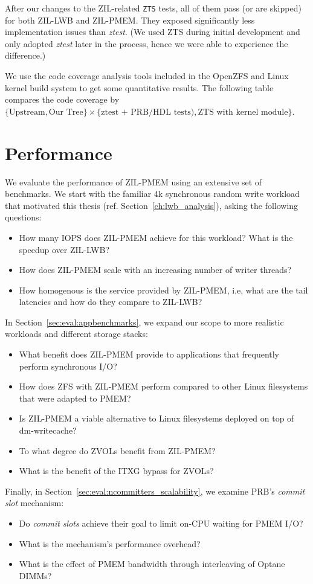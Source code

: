 \documentclass[12pt,a4paper,twoside]{book}
\begin{document}
After our changes to the ZIL-related \lstinline{ZTS} tests, all of them pass (or are skipped) for both ZIL-LWB and ZIL-PMEM.
They exposed significantly less implementation issues than \textit{ztest}.
(We used ZTS during initial development and only adopted \textit{ztest} later in the process, hence we were able to experience the difference.)

We use the code coverage analysis tools included in the OpenZFS and Linux kernel build system to get some quantitative results.
The following table compares the code coverage by $\{\text{Upstream}, \text{Our Tree}\} \times  \{\text{ztest + PRB/HDL tests}), \text{ZTS with kernel module}\}$.

\clearpage

\section{Performance}

We evaluate the performance of ZIL-PMEM using an extensive set of benchmarks.
We start with the familiar 4k synchronous random write workload that motivated this thesis (ref. Section~\ref{ch:lwb_analysis}), asking the following questions:
\begin{itemize}[noitemsep]
    \item How many IOPS does ZIL-PMEM achieve for this workload? What is the speedup over ZIL-LWB?
    \item How does ZIL-PMEM scale with an increasing number of writer threads?
    \item How homogenous is the service provided by ZIL-PMEM, i.e, what are the tail latencies and how do they compare to ZIL-LWB?
\end{itemize}
In Section~\ref{sec:eval:appbenchmarks}, we expand our scope to more realistic workloads and different storage stacks:
\begin{itemize}[noitemsep]
    \item What benefit does ZIL-PMEM provide to applications that frequently perform synchronous I/O?
    \item How does ZFS with ZIL-PMEM perform compared to other Linux filesystems that were adapted to PMEM?
    \item Is ZIL-PMEM a viable alternative to Linux filesystems deployed on top of dm-writecache?
    \item To what degree do ZVOLs benefit from ZIL-PMEM?
    \item What is the benefit of the ITXG bypass for ZVOLs?
\end{itemize}
Finally, in Section~\ref{sec:eval:ncommitters_scalability}, we examine PRB's \textit{commit slot} mechanism:
\begin{itemize}[noitemsep]
    \item Do \textit{commit slots} achieve their goal to limit on-CPU waiting for PMEM I/O?
    \item What is the mechanism's performance overhead?
    \item What is the effect of PMEM bandwidth through interleaving of Optane DIMMs?
\end{itemize}
\end{document}
